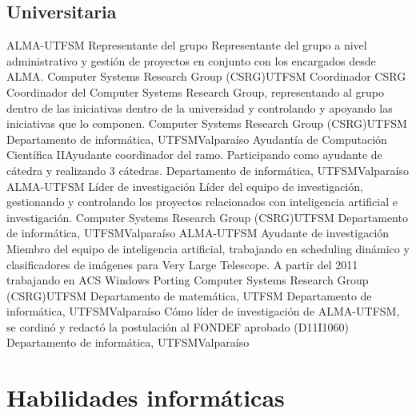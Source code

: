 \documentclass[11pt,a4paper]{moderncv}
\begin{document}
\subsection{Universitaria}
	{ALMA-UTFSM Representante del grupo}
	{Representante del grupo a nivel administrativo y gestión de proyectos en conjunto con los encargados desde ALMA.}
	{Computer Systems Research Group (CSRG)}{UTFSM}{}
	{Coordinador CSRG}
	{Coordinador del Computer Systems Research Group, representando al grupo dentro de las iniciativas dentro de la universidad
		y controlando y apoyando las iniciativas que lo componen.}
	{Computer Systems Research Group (CSRG)}{UTFSM}{}
	{Departamento de informática, UTFSM}{Valparaíso}{}
	{Ayudantía de Computación Científica II}{Ayudante coordinador del ramo. Participando como ayudante de cátedra y realizando 3 cátedras.}
	{Departamento de informática, UTFSM}{Valparaíso}{}
	{ALMA-UTFSM Líder de investigación}
	{Líder del equipo de investigación, gestionando y controlando los proyectos relacionados con inteligencia artificial e investigación.}
	{Computer Systems Research Group (CSRG)}{UTFSM}{}
	{Departamento de informática, UTFSM}{Valparaíso}{}
	{ALMA-UTFSM Ayudante de investigación}
	{Miembro del equipo de inteligencia artificial, trabajando en scheduling dinámico y clasificadores de imágenes para Very Large Telescope. A partir del 2011 trabajando en ACS Windows Porting}
	{Computer Systems Research Group (CSRG)}{UTFSM}{}
	{Departamento de matemática, UTFSM}{}{}
	{Departamento de informática, UTFSM}{Valparaíso}{}
	{Cómo líder de investigación de ALMA-UTFSM, se cordinó y redactó la postulación al FONDEF aprobado (D11I1060)}
	{Departamento de informática, UTFSM}{Valparaíso}{}

\section{Habilidades informáticas}
\end{document}
